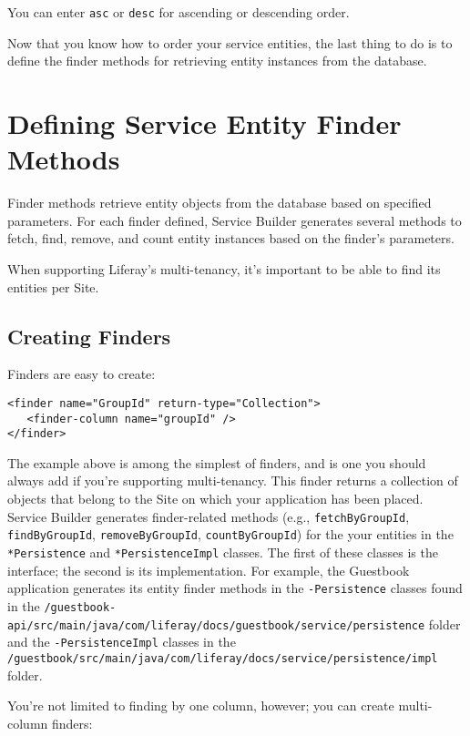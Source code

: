You can enter \texttt{asc} or \texttt{desc} for ascending or descending
order.

Now that you know how to order your service entities, the last thing to
do is to define the finder methods for retrieving entity instances from
the database.

\chapter{Defining Service Entity Finder
Methods}\label{defining-service-entity-finder-methods}

Finder methods retrieve entity objects from the database based on
specified parameters. For each finder defined, Service Builder generates
several methods to fetch, find, remove, and count entity instances based
on the finder's parameters.

When supporting Liferay's multi-tenancy, it's important to be able to
find its entities per Site.

\section{Creating Finders}\label{creating-finders}

Finders are easy to create:

\begin{verbatim}
<finder name="GroupId" return-type="Collection">
   <finder-column name="groupId" />
</finder> 
\end{verbatim}

The example above is among the simplest of finders, and is one you
should always add if you're supporting multi-tenancy. This finder
returns a collection of objects that belong to the Site on which your
application has been placed. Service Builder generates finder-related
methods (e.g., \texttt{fetchByGroupId}, \texttt{findByGroupId},
\texttt{removeByGroupId}, \texttt{countByGroupId}) for the your entities
in the \texttt{*Persistence} and \texttt{*PersistenceImpl} classes. The
first of these classes is the interface; the second is its
implementation. For example, the Guestbook application generates its
entity finder methods in the \texttt{-Persistence} classes found in the
\texttt{/guestbook-api/src/main/java/com/liferay/docs/guestbook/service/persistence}
folder and the \texttt{-PersistenceImpl} classes in the
\texttt{/guestbook/src/main/java/com/liferay/docs/service/persistence/impl}
folder.

You're not limited to finding by one column, however; you can create
multi-column finders:

